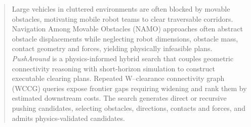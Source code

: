 \begin{abstract}
Large vehicles in cluttered environments are often blocked by movable
obstacles, motivating mobile robot teams to clear traversable corridors.
Navigation Among Movable Obstacles (NAMO) approaches often abstract obstacle
displacements while neglecting robot dimensions, obstacle mass, contact
geometry and forces, yielding physically infeasible plans.
\emph{PushAround} is a physics-informed hybrid search that couples geometric
connectivity reasoning with short-horizon simulation to construct executable
clearing plans. Repeated W--clearance connectivity graph (WCCG) queries expose
frontier gaps requiring widening and rank them by estimated downstream costs.
The search generates direct or recursive pushing candidates, selecting
obstacles, directions, contacts and forces, and admits physics-validated
candidates.
\end{abstract}
